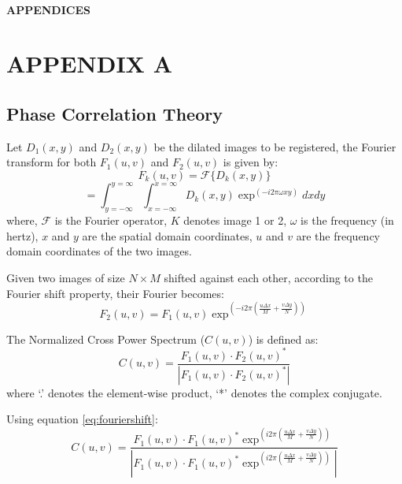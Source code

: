 

\thispagestyle{empty}
\begin{centering}
\Huge{\textbf{\\[8cm]\uppercase{Appendices}}}\\[1.2cm]
\end{centering}
\normalsize{}

\newpage
{}
\chapter*{\uppercase{Appendix A}} \label{A}
\section*{Phase Correlation Theory}
Let $D_{1}(x,y)$ and $D_{2}(x,y)$ be the dilated images to be registered, the Fourier transform for both $F_{1}(u,v)$ and $F_{2}(u,v)$ is given by:
\[F_{k}(u,v)= \mathcal{F}\{D_{k}(x,y)\}\]
\begin{equation}\label{eq:fourier}
=\int_{y=-\infty}^{y=\infty}\int_{x=-\infty}^{x=\infty}D_{k}(x,y)\exp^{\left(-i2\pi\omega xy\right)}dxdy
\end{equation}
where, $\mathcal{F}$ is the Fourier operator, $K$ denotes image 1 or 2, $\omega$ is the frequency (in hertz), $x$ and $y$ are the spatial domain coordinates, $u$ and $v$ are the frequency domain coordinates of the two images.

Given two images of size $N\times M$ shifted against each other, according to the Fourier shift property, their Fourier becomes:
\begin{equation}\label{eq:fouriershift}
F_{2}(u,v)= F_{1}(u,v)\exp^{\left(-i2\pi\left(\frac{u\Delta x}{M}+\frac{v\Delta y}{N}\right)\right)}
\end{equation}

The Normalized Cross Power Spectrum ($C(u,v)$) is defined as:
\begin{equation}
C(u,v)= \frac{F_{1}(u,v)\cdot F_{2}(u,v)^{*}}{\left|F_{1}(u,v)\cdot F_{2}(u,v)^{*}\right|}
\end{equation}
where `.' denotes the element-wise product, `*' denotes the complex conjugate.

Using equation \ref{eq:fouriershift}:
\begin{equation}
C(u,v)= \frac{F_{1}(u,v)\cdot F_{1}(u,v)^{*}\exp^{\left(i2\pi\left(\frac{u\Delta x}{M}+\frac{v\Delta y}{N}\right)\right)}}{\left|F_{1}(u,v)\cdot F_{1}(u,v)^{*}\exp^{\left(i2\pi\left(\frac{u\Delta x}{M}+\frac{v\Delta y}{N}\right)\right)}\right|}
\end{equation}

